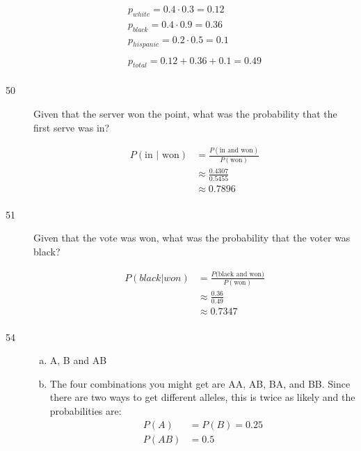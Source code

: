 \documentclass[letterpaper, landscape]{exam}
\begin{document}
\begin{description}
      \begin{align*}
        p_{white} = 0.4 \cdot 0.3 = 0.12 \\
        p_{black} = 0.4 \cdot 0.9 = 0.36 \\
        p_{hispanic} = 0.2 \cdot 0.5 = 0.1 \\
        \\
        p_{total} = 0.12 + 0.36 + 0.1 = \boxed{ 0.49 } \\
      \end{align*}

    \item[50]
      Given that the server won the point, what was the probability that the first
      serve was in?

      \begin{align*}
        P(\text{in } | \text{ won}) & = \frac{P(\text{in and won})}{P(\text{won})} \\
                    & \approx \frac{0.4307}{0.5455} \\
                    & \approx \boxed{ 0.7896 } \\
      \end{align*}

    \item[51]
      Given that the vote was won, what was the probability that the voter was black?

      \begin{align*}
        P(black | won) & = \frac{P(\text{black and won)}}{P(\text{won})} \\
                       & \approx \frac{0.36}{0.49} \\
                       & \approx \boxed{ 0.7347 } \\
      \end{align*}

    \item[54]
      \begin{enumerate}[(a)]
        \item A, B and AB

        \item
          The four combinations you might get are AA, AB, BA, and BB. Since there are 
          two ways to get different alleles, this is twice as likely and the probabilities
          are:
          \begin{align*}
            P(A)  & = P(B) = 0.25 \\
            P(AB) & = 0.5 \\
          \end{align*}
      \end{enumerate}


\end{description}
\end{document}
